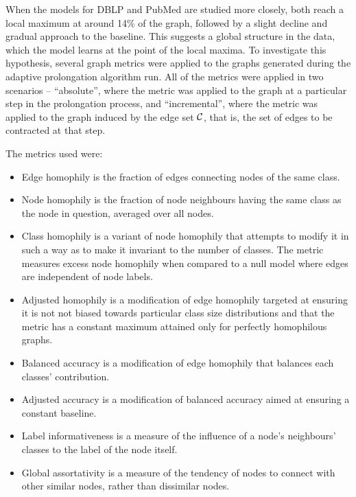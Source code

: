 When the models for DBLP and PubMed are studied more closely, both reach a local maximum at around 14\% of the graph, followed by a slight decline and gradual approach to the baseline. This suggests a global structure in the data, which the model learns at the point of the local maxima. To investigate this hypothesis, several graph metrics were applied to the graphs generated during the adaptive prolongation algorithm run. All of the metrics were applied in two scenarios -- \enquote{absolute}, where the metric was applied to the graph at a particular step in the prolongation process, and \enquote{incremental}, where the metric was applied to the graph induced by the edge set \( \mathcal{C} \), that is, the set of edges to be contracted at that step.

The metrics used were:
\begin{itemize}
  \item Edge homophily \cite{zhu_beyond_2020} is the fraction of edges connecting nodes of the same class.
  \item Node homophily \cite{pei_geom-gcn_2020} is the fraction of node neighbours having the same class as the node in question, averaged over all nodes.
  \item Class homophily \cite{lim_large_2021} is a variant of node homophily that attempts to modify it in such a way as to make it invariant to the number of classes. The metric measures excess node homophily when compared to a null model where edges are independent of node labels.
  \item Adjusted homophily \cite{platonov_characterizing_2022} is a modification of edge homophily targeted at ensuring it is not not biased towards particular class size distributions and that the metric has a constant maximum attained only for perfectly homophilous graphs.
  \item Balanced accuracy \cite{platonov_characterizing_2022} is a modification of edge homophily that balances each classes' contribution.
  \item Adjusted accuracy \cite{platonov_characterizing_2022} is a modification of balanced accuracy aimed at ensuring a constant baseline.
  \item Label informativeness \cite{platonov_characterizing_2022} is a measure of the influence of a node's neighbours' classes to the label of the node itself.
  \item Global assortativity \cite{newman_mixing_2003} is a measure of the tendency of nodes to connect with other similar nodes, rather than dissimilar nodes.
\end{itemize}

